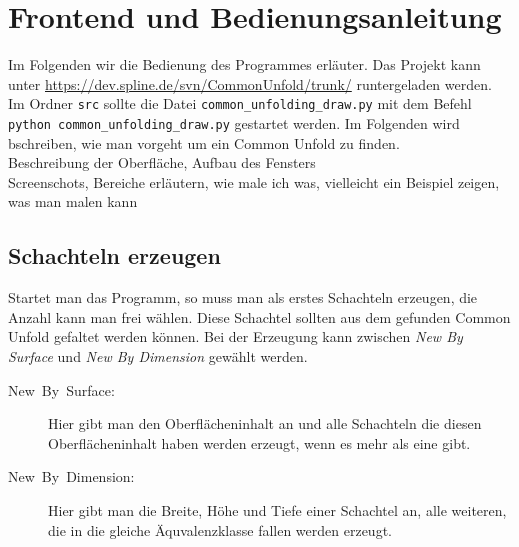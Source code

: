 \section{Frontend und Bedienungsanleitung}
\label{sec:frontend}

Im Folgenden wir die Bedienung des Programmes erläuter. Das Projekt kann unter \url{https://dev.spline.de/svn/CommonUnfold/trunk/} runtergeladen werden. Im Ordner \texttt{src} sollte die Datei \texttt{common\_unfolding\_draw.py} mit dem Befehl \texttt{python common\_unfolding\_draw.py} gestartet werden. Im Folgenden wird bschreiben, wie man vorgeht um ein Common Unfold zu finden.\\

Beschreibung der Oberfläche, Aufbau des Fensters\\

Screenschots, Bereiche erläutern, wie male ich was, vielleicht ein
Beispiel zeigen, was man malen kann\\


\subsection{Schachteln erzeugen}
\label{subsec:schachteln}

Startet man das Programm, so muss man als erstes Schachteln erzeugen, die Anzahl kann man frei wählen. Diese Schachtel sollten aus dem gefunden Common Unfold gefaltet werden können. Bei der Erzeugung kann zwischen \emph{New By Surface} und \emph{New By Dimension} gewählt werden.

  \begin{description}
    \item [{New~By~Surface:}] Hier gibt man den Oberflächeninhalt an und alle Schachteln die diesen Oberflächeninhalt haben werden erzeugt, wenn es mehr als eine gibt.
    \item [{New~By~Dimension:}] Hier gibt man die Breite, Höhe und Tiefe einer Schachtel an, alle weiteren, die in die gleiche Äquvalenzklasse fallen werden erzeugt.
  \end{description}


